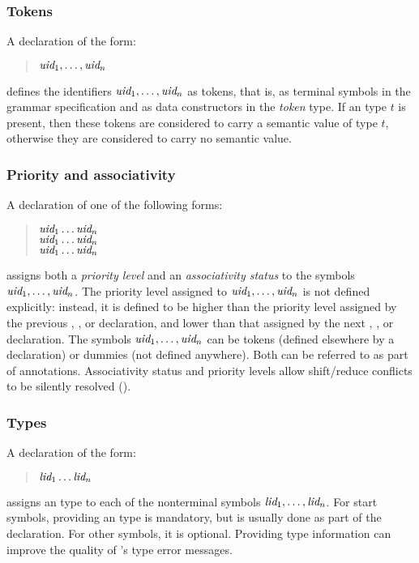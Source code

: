 \documentclass[onecolumn,11pt,nocopyrightspace,preprint]{sigplanconf}
\begin{document}
\subsubsection{Tokens}

A declaration of the form:
\begin{quote}
\dtoken \optional{\ocamltype} $\textit{uid}_1, \ldots, \textit{uid}_n$
\end{quote}
defines the identifiers $\textit{uid}_1, \ldots, \textit{uid}_n$ as tokens, that is,
as terminal symbols in the grammar specification and as data constructors in
the \textit{token} type. If an \ocaml type $t$ is present, then these tokens
are considered to carry a semantic value of type $t$, otherwise they are
considered to carry no semantic value.

\subsubsection{Priority and associativity}
\label{sec:assoc}

A declaration of one of the following forms:
\begin{quote}
\dnonassoc $\textit{uid}_1 \ldots \textit{uid}_n$ \\
\dleft $\textit{uid}_1 \ldots \textit{uid}_n$ \\
\dright $\textit{uid}_1 \ldots \textit{uid}_n$
\end{quote}
assigns both a \emph{priority level} and an \emph{associativity status} to
the symbols $\textit{uid}_1, \ldots, \textit{uid}_n$. The priority level assigned to
$\textit{uid}_1, \ldots, \textit{uid}_n$ is not defined explicitly: instead, it is
defined to be higher than the priority level assigned by the previous
\dnonassoc, \dleft, or \dright declaration, and lower than that assigned by the next
\dnonassoc, \dleft, or \dright declaration. The symbols $\textit{uid}_1, \ldots, \textit{uid}_n$
can be tokens (defined elsewhere by a \dtoken declaration) or dummies (not
defined anywhere). Both can be referred to as part of \dprec annotations.
Associativity status and priority levels allow shift/reduce conflicts to be
silently resolved ().

\subsubsection{Types}
\label{sec:type}

A declaration of the form:
\begin{quote}
\dtype \ocamltype $\textit{lid}_1 \ldots \textit{lid}_n$
\end{quote}
assigns an \ocaml type to each of the nonterminal symbols $\textit{lid}_1, \ldots, \textit{lid}_n$.
For start symbols, providing an \ocaml type is mandatory, but is usually done as part of the
\dstart declaration. For other symbols, it is optional. Providing type information can improve
the quality of \ocaml's type error messages.
\end{document}
